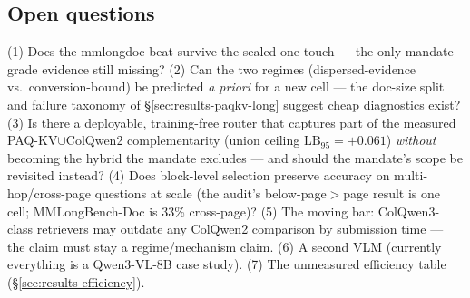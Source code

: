 \documentclass[11pt,letterpaper]{article}
\newcommand{\paqc}{\textsc{PAQ-KV}}
\newcommand{\lb}{\mathrm{LB}_{95}}
\begin{document}
\subsection{Open questions}
(1) Does the mmlongdoc beat survive the sealed one-touch --- the only mandate-grade evidence
still missing? (2) Can the two regimes (dispersed-evidence vs.\ conversion-bound) be predicted
\emph{a priori} for a new cell --- the doc-size split and failure taxonomy of
\S\ref{sec:results-paqkv-long} suggest cheap diagnostics exist? (3) Is there a deployable,
training-free router that captures part of the measured \paqc{}$\cup$ColQwen2 complementarity
(union ceiling $\lb=+0.061$) \emph{without} becoming the hybrid the mandate excludes --- and
should the mandate's scope be revisited instead? (4) Does block-level selection preserve
accuracy on multi-hop/cross-page questions at scale (the audit's below-page$>$page result is
one cell; MMLongBench-Doc is 33\% cross-page)? (5) The moving bar: ColQwen3-class retrievers
may outdate any ColQwen2 comparison by submission time --- the claim must stay a
regime/mechanism claim. (6) A second VLM (currently everything is a Qwen3-VL-8B case study).
(7) The unmeasured efficiency table (\S\ref{sec:results-efficiency}).

\end{document}
